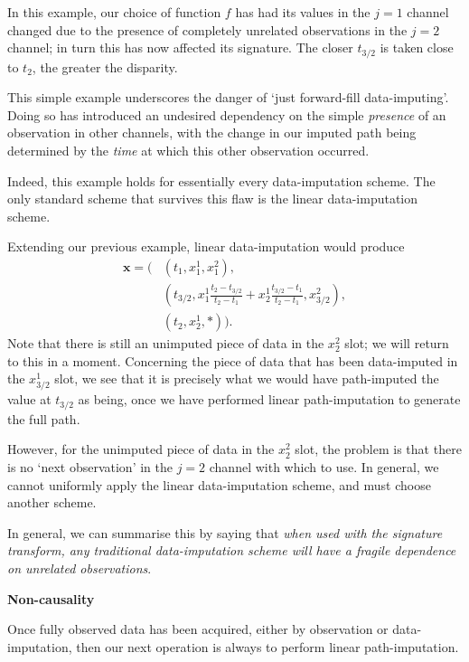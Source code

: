 \documentclass{article}
\renewcommand{\subsubsection}[1]{\textbf{#1}

} %
\begin{document}
In this example, our choice of function $f$ has had its values in the $j=1$ channel changed due to the presence of completely unrelated observations in the $j=2$ channel; in turn this has now affected its signature. The closer $t_{3/2}$ is taken close to $t_2$, the greater the disparity.

This simple example underscores the danger of `just forward-fill data-imputing'. Doing so has introduced an undesired dependency on the simple \emph{presence} of an observation in other channels, with the change in our imputed path being determined by the \emph{time} at which this other observation occurred.

Indeed, this example holds for essentially every data-imputation scheme. The only standard scheme that survives this flaw is the linear data-imputation scheme.

Extending our previous example, linear data-imputation would produce
\begin{align*}
    \mathbf{x} = (&(t_1, x_1^1, x_1^2),\\
    &(t_{3/2}, x_1^1 \frac{t_2 - t_{3/2}}{t_2 - t_1} + x_2^1 \frac{t_{3/2} - t_1}{t_2 - t_1}, x_{3/2}^2),\\
    &(t_2, x_2^1, *)).
\end{align*}
Note that there is still an unimputed piece of data in the $x_2^2$ slot; we will return to this in a moment. Concerning the piece of data that has been data-imputed in the $x_{3/2}^1$ slot, we see that it is precisely what we would have path-imputed the value at $t_{3/2}$ as being, once we have performed linear path-imputation to generate the full path.

However, for the unimputed piece of data in the $x_2^2$ slot, the problem is that there is no `next observation' in the $j=2$ channel with which to use. In general, we cannot uniformly apply the linear data-imputation scheme, and must choose another scheme.

In general, we can summarise this by saying that \emph{when used with the signature transform, any traditional data-imputation scheme will have a fragile dependence on unrelated observations}.

\subsubsection{Non-causality}
Once fully observed data has been acquired, either by observation or data-imputation, then our next operation is always to perform linear path-imputation.
\end{document}
